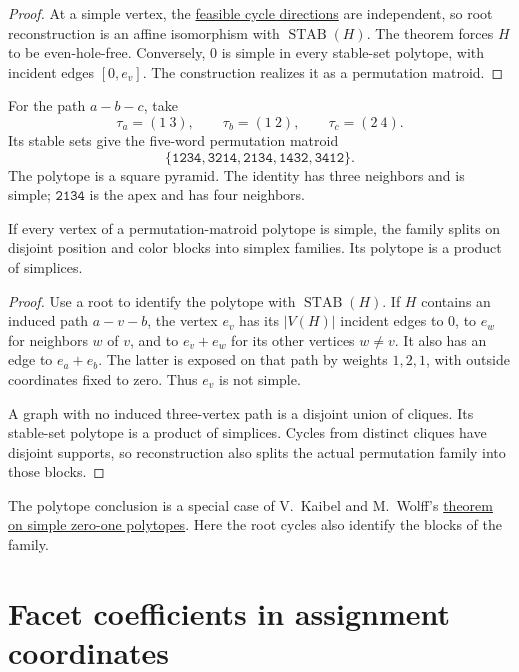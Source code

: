\begin{proof}
At a simple vertex, the
\href{permutations.htm#rootCycles}{feasible cycle directions} are
independent, so root reconstruction is an affine isomorphism with
$\operatorname{STAB}(H)$. The theorem forces $H$ to be even-hole-free.
Conversely, $0$ is simple in every stable-set polytope, with incident
edges $[0,e_v]$. The construction realizes it as a permutation matroid.
\end{proof}

\begin{example}
For the path $a-b-c$, take
\[
 \tau_a=(1\ 3),\qquad
 \tau_b=(1\ 2),\qquad
 \tau_c=(2\ 4).
\]
Its stable sets give the five-word permutation matroid
\[
 \{\mathtt{1234},\mathtt{3214},\mathtt{2134},
   \mathtt{1432},\mathtt{3412}\}.
\]
The polytope is a square pyramid. The identity has three neighbors
and is simple; $\mathtt{2134}$ is the apex and has four neighbors.
\end{example}

\begin{corollary}
If every vertex of a permutation-matroid polytope is simple, the
family splits on disjoint position and color blocks into simplex
families. Its polytope is a product of simplices.
\end{corollary}

\begin{proof}
Use a root to identify the polytope with $\operatorname{STAB}(H)$.
If $H$ contains an induced path $a-v-b$, the vertex $e_v$ has its
$|V(H)|$ incident edges to $0$, to $e_w$ for neighbors $w$ of $v$,
and to $e_v+e_w$ for its other vertices $w\ne v$.
It also has an edge to $e_a+e_b$.
The latter is exposed on that path by weights $1,2,1$, with outside
coordinates fixed to zero. Thus $e_v$ is not simple.

A graph with no induced three-vertex path is a disjoint union of
cliques. Its stable-set polytope is a product of simplices.
Cycles from distinct cliques have disjoint supports, so reconstruction
also splits the actual permutation family into those blocks.
\end{proof}

The polytope conclusion is a special case of V.~Kaibel and M.~Wolff's
\href{https://doi.org/10.1006/eujc.1999.0328}{theorem on simple zero-one
polytopes}. Here the root cycles also identify the blocks of the family.

\section[stableSetCoefficients]{Facet coefficients in assignment coordinates}

